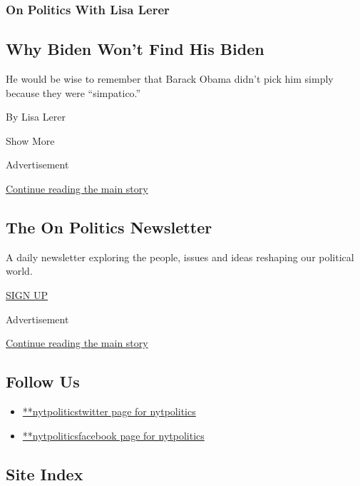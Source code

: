 \begin{enumerate}
  \hypertarget{on-politics-with-lisa-lerer}{%
  \subsubsection{On Politics With Lisa
  Lerer}\label{on-politics-with-lisa-lerer}}

  \hypertarget{why-biden-wont-find-his-biden}{%
  \subsection{Why Biden Won't Find His
  Biden}\label{why-biden-wont-find-his-biden}}

  He would be wise to remember that Barack Obama didn't pick him simply
  because they were ``simpatico.''

  By Lisa Lerer
\end{enumerate}

Show More

Advertisement

\protect\hyperlink{after-mid2}{Continue reading the main story}

\hypertarget{the-on-politics-newsletter}{%
\subsection{The On Politics
Newsletter}\label{the-on-politics-newsletter}}

A daily newsletter exploring the people, issues and ideas reshaping our
political world.

\href{/newsletters/signup/CN}{SIGN UP}

Advertisement

\protect\hyperlink{after-mktg}{Continue reading the main story}

\hypertarget{follow-us}{%
\subsection{Follow Us}\label{follow-us}}

\begin{itemize}
\tightlist
\item
  \href{https://twitter.com/nytpolitics}{**nytpoliticstwitter page for
  nytpolitics}
\item
  \href{https://www.facebook.com/nytpolitics}{**nytpoliticsfacebook page
  for nytpolitics}
\end{itemize}

\hypertarget{site-index}{%
\subsection{Site Index}\label{site-index}}

